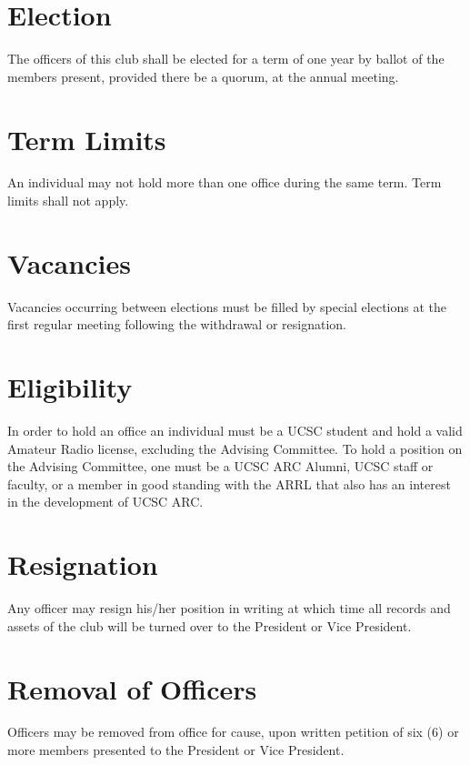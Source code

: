 \documentclass{report}
\begin{document}
\section{Election}

The officers of this club shall be elected for a term of one year by ballot of the members    \makeatletter
      \renewcommand\l@subsection{\@dottedtocline{2}{1.5em}{3em}}
    \makeatother
 present, provided there be a quorum, at the annual meeting.

\section{Term Limits}

An individual may not hold more than one office during the same term. Term limits shall not apply.  

\section{Vacancies}

Vacancies occurring between elections must be filled by special elections at the first regular meeting following the withdrawal or resignation.

\section{Eligibility}

In order to hold an office an individual must be a UCSC student and hold a valid Amateur Radio license, excluding the Advising Committee. To hold a position on the Advising Committee, one must be a UCSC ARC Alumni, UCSC staff or faculty, or a member in good standing with the ARRL that also has an interest in the development of UCSC ARC.

\section{Resignation}

Any officer may resign his/her position in writing at which time all records and assets of the club will be turned over to the President or Vice President.

\section{Removal of Officers}

Officers may be removed from office for cause, upon written petition of six (6) or more members presented to the President or Vice President.\\
\end{document}
